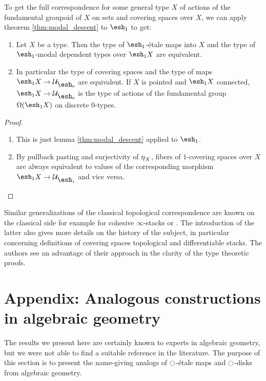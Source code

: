\documentclass[9pt,twosided]{amsart}
\newcommand{\shape}{\ensuremath{\mathord{\raisebox{0.5pt}{\text{\rm\esh}}}}}
\begin{document}
To get the full correspondence for some general type $X$ of actions of the fundamental groupoid of $X$ on sets and covering spaces over $X$,
we can apply theorem \ref{thm:modal_descent} to $\shape_1$ to get:

\begin{thm}
  \begin{enumerate}
  \item Let $X$ be a type. Then the type of $\shape_1$-étale maps into $X$ and the type of $\shape_1$-modal dependent types over $\shape_1 X$ are equivalent.
  \item In particular the type of covering spaces and the type of maps $\shape_1X\to \mathcal U_{\shape_0}$ are equivalent.
    If $X$ is pointed and $\shape_1 X$ connected, $\shape_1X\to \mathcal U_{\shape_0}$ is the type of actions of the fundamental group $\Omega(\shape_1 X)$ on discrete $0$-types.
  \end{enumerate}
\end{thm}
\begin{proof}
  \begin{enumerate}
  \item This is just lemma \ref{thm:modal_descent} applied to $\shape_1$.
  \item By pullback pasting and surjectivity of ${\eta_{}}_X$, fibers of $1$-covering spaces over $X$ are always equivalent to values of the corresponding morphism $\shape_1 X\to \mathcal U_{\shape_1}$ and vice versa.
  \end{enumerate}
\end{proof}

Similar generalizations of the classical topological correspondence are known on the classical side
for example for cohesive $\infty$-stacks \cite[Section 5.2.7]{SchreiberDcct} or \cite{dmr-2covers}.
The introduction of the latter also gives more details on the history of the subject,
in particular concerning definitions of covering spaces topological and differentiable stacks.
The authors see an advantage of their approach in the clarity of the type theoretic proofs.

\section*{Appendix: Analogous constructions in algebraic geometry}
\label{subsection:algebraic geometry}
The results we present here are certainly known to experts in algebraic geometry,
but we were not able to find a suitable reference in the literature.
The purpose of this section is to present the name-giving analogs of ${\ocircle}$-étale maps and ${\ocircle}$-disks from algebraic geometry.
\end{document}
